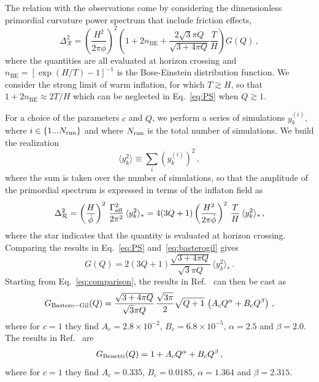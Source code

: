 The relation with the observations come by considering the dimensionless primordial curvature power spectrum that include friction effects,
\begin{equation}
    \label{eq:PS}
    \Delta_{\mathcal{R}}^{2}=\left(\frac{H^{2}}{2 \pi \dot{\phi}}\right)^{2}\left(1 + 2 n_{\mathrm{BE}}+\frac{2 \sqrt{3} \pi Q}{\sqrt{3+4 \pi Q}} \frac{T}{H}\right) G(Q)\,,
\end{equation}
where the quantities are all evaluated at horizon crossing and $n_{\mathrm{BE}} = [\exp(H/T )-1]^{-1}$ is the Bose-Einstein distribution function. We consider the strong limit of warm inflation, for which $T \gtrsim H$, so that $1+2n_{\mathrm{BE}} \approx 2T/H$ which can be neglected in Eq.~\eqref{eq:PS} when $Q \gtrsim 1$.

For a choice of the parameters $c$ and $Q$, we perform a series of simulations $y_k^{(i)}$, where $i \in \{1... N_{\rm run}\}$ and where $N_{\rm run}$ is the total number of simulations. We build the realization
\begin{equation}
    \langle y_k^2 \rangle \equiv \sum_i (y_k^{(i)})^2\,,
\end{equation}
where the sum is taken over the number of simulations, so that the amplitude of the primordial spectrum is expressed in terms of the inflaton field as~\cite{Bastero-Gil:2011rva}
\begin{equation}
    \label{eq:basterogil}
	\Delta_{\mathcal{R}}^{2} = \left(\frac{H}{\dot\phi}\right)^2\,\frac{\Gamma_{\rm eff}^2}{2\pi^2}\,\langle y_k^2\rangle_* = 4(3Q+1)\left(\frac{H^2}{2\pi\dot\phi}\right)^2\,\frac{T}{H}\,\langle y_k^2\rangle_*\,,
\end{equation}
where the star indicates that the quantity is evaluated at horizon crossing. Comparing the results in Eq.~\eqref{eq:PS} and~\eqref{eq:basterogil} gives
\begin{equation}
    \label{eq:comparison}
    G(Q) = 2 (3 Q + 1 ) \frac{\sqrt{3 + 4 \pi Q}}{\sqrt{3} \pi Q}\,\langle y_k^2\rangle_*\,.
\end{equation}
Starting from Eq.~\eqref{eq:comparison}, the results in Ref.~\cite{Bastero-Gil:2011rva} can then be cast as
\begin{equation}
    G_{\rm Bastero-Gil}(Q) = \frac{\sqrt{3 + 4 \pi Q}}{\sqrt{3} \pi Q}\,\frac{\sqrt{3\pi}}{2}\sqrt{Q+1}\,\left(A_cQ^\alpha+B_cQ^\beta\right)\,,
\end{equation}
where for $c = 1$ they find $A_c = 2.8\times 10^{-2}$, $B_c = 6.8 \times 10^{-5}$, $\alpha = 2.5$ and $\beta = 2.0$. The results in Ref.~\cite{Benetti:2016jhf} are
\begin{equation}
    G_{\rm Benetti}(Q) = 1 + A_cQ^\alpha+B_cQ^\beta\,,
\end{equation}
where for $c =1$ they find $A_c = 0.335$, $B_c = 0.0185$, $\alpha = 1.364$ and $\beta = 2.315$. 

